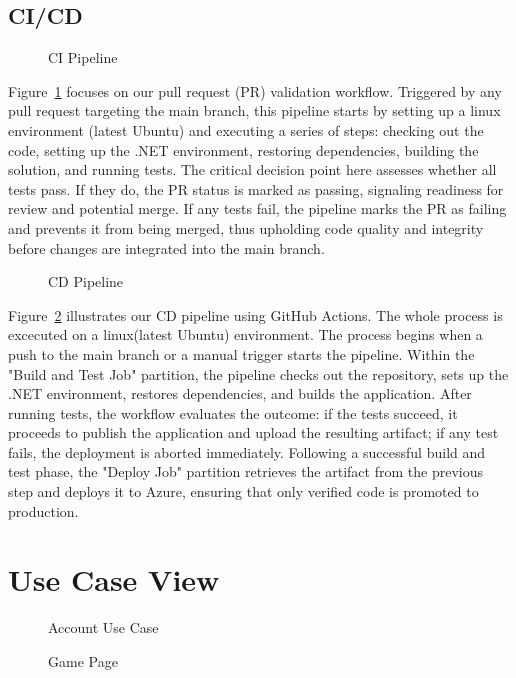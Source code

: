 \documentclass[11pt,a4paper]{article}
\newcommand{\inputdiagram}[1]{}
\newcommand{\textwidthdiagram}[2][1]{%
  \resizebox{#1\textwidth}{!}{\inputdiagram{#2}}%
}
\begin{document}
\subsection{CI/CD}

\begin{figure}[H]
        \centering
        \textwidthdiagram[0.8]{CI.tex}
        \caption{CI Pipeline}
        \label{fig:CI_pipeline}
\end{figure}
Figure~\ref{fig:CI_pipeline} focuses on our pull request (PR) validation
workflow. Triggered by any pull request targeting the main branch, this
pipeline starts by setting up a linux environment (latest Ubuntu) and
executing a series of steps: checking out the code, setting up the .NET
environment, restoring dependencies, building the solution, and running
tests. The critical decision point here assesses whether all tests pass. If
they do, the PR status is marked as passing, signaling readiness for review
and potential merge. If any tests fail, the pipeline marks the PR as failing
and prevents it from being merged, thus upholding code quality and integrity
before changes are integrated into the main branch.

\begin{figure}[H]
    \centering
    \textwidthdiagram[0.8]{CD.tex}
    \caption{CD Pipeline}
    \label{fig:CD_pipeline}
\end{figure}
Figure~\ref{fig:CD_pipeline} illustrates our CD pipeline using GitHub
Actions. The whole process is excecuted on a linux(latest Ubuntu)
environment. The process begins when a push to the main branch or a manual
trigger starts the pipeline. Within the "Build and Test Job" partition,
the pipeline checks out the repository, sets up the .NET environment,
restores dependencies, and builds the application. After running tests,
the workflow evaluates the outcome: if the tests succeed, it proceeds to
publish the application and upload the resulting artifact; if any test fails,
the deployment is aborted immediately. Following a successful build and test
phase, the "Deploy Job" partition retrieves the artifact from the previous
step and deploys it to Azure, ensuring that only verified code is promoted
to production.

\section{Use Case View}

\begin{figure}[H]
    \centering
    \begin{minipage}[b]{0.48\textwidth}
        \centering
        \textwidthdiagram{use_case_account.tex}
        \caption{Account Use Case}
        \label{fig:use_case_account}
    \end{minipage}
    \hfil
    \begin{minipage}[b]{0.48\textwidth}
        \centering
        \textwidthdiagram{use_case_game_page.tex}
        \caption{Game Page}
        \label{fig:use_case_game_page}
    \end{minipage}
\end{figure}
\end{document}
